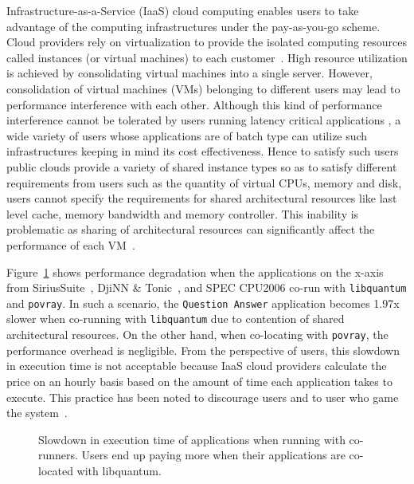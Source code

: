 \documentclass{sig-alternate}
\begin{document}
Infrastructure-as-a-Service (IaaS) cloud computing enables users to take advantage of the computing infrastructures under the pay-as-you-go scheme. Cloud providers rely on virtualization to provide the isolated computing resources called instances (or virtual machines) to each customer~\cite{aws,gce}. High resource utilization is achieved by consolidating virtual machines into a single server. However, consolidation of virtual machines (VMs) belonging to different users may lead to performance interference with each other. Although this kind of performance interference cannot be tolerated by users running latency critical applications \cite{6076756,privatepublic,Marston:2011:CCB:1943771.1943810}, a wide variety of users whose applications are of batch type can utilize such infrastructures keeping in mind its cost effectiveness. Hence to satisfy such users public clouds provide a variety of shared instance types so as to satisfy different requirements from users such as the quantity of virtual CPUs, memory and disk, users cannot specify the requirements for shared architectural resources like last level cache, memory bandwidth and memory controller. This inability is problematic as sharing of architectural resources can significantly affect the performance of each VM~\cite{Nathuji:2010:QMP:1755913.1755938,Govindan:2011:CQE:2038916.2038938,Ahn:2012:DVM:2342763.2342782,Varadarajan:2012:RAI:2382196.2382228,Vasic:2012:DAR:2248487.2151021,Novakovic:2013:DTI:2535461.2535489,Ma:2015:SDS:2694344.2694382,Liu:2014:OVM:2665671.2665720, 6522328}.

Figure~\ref{fig:comparecorun} shows performance degradation when the applications on the x-axis from SiriusSuite~\cite{sirius}, DjiNN \& Tonic~\cite{djinn}, and SPEC CPU2006 co-run with \texttt{libquantum} and \texttt{povray}. In such a scenario, the \texttt{Question Answer} application becomes 1.97x slower when co-running with \texttt{libquantum} due to contention of shared architectural resources. On the other hand, when co-locating with \texttt{povray}, the performance overhead is negligible. From the perspective of users, this slowdown in execution time is not acceptable because IaaS cloud providers calculate the price on an hourly basis based on the amount of time each application takes to execute.  This practice has been noted to discourage users and to user who game the system~\cite{Varadarajan:2012:RAI:2382196.2382228}.
\begin{figure}
\centering
\begin{minipage}[t]{1\columnwidth}
\centering
{}
\caption{Slowdown in execution time of applications when running with co-runners. Users end up paying more when their applications are co-located with libquantum.}
\label{fig:comparecorun}
\end{minipage}
\end{figure}
\end{document}
